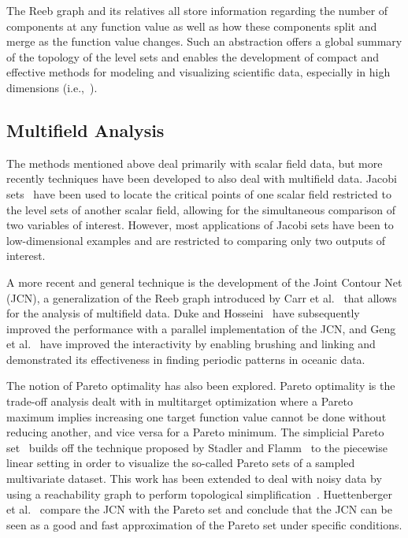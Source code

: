 
The Reeb graph and its relatives all store information regarding the number of components at any function value as well as how these components split and merge as the function value changes.
%
Such an abstraction offers a global summary of the topology of the level sets and enables the development of compact and effective methods for modeling and visualizing scientific data, especially in high dimensions (i.e.,~\cite{SinghMemoliCarlsson2007, NicolauLevineCarlsson2011}).

\subsection{Multifield Analysis}

The methods mentioned above deal primarily with scalar field data, but more recently techniques have been developed to also deal with multifield data.
%
Jacobi sets~\cite{EdelsbrunnerHarer2002} have been used to locate the critical points of one scalar field restricted to the level sets of another scalar field, allowing for the simultaneous comparison of two variables of interest.
%
However, most applications of Jacobi sets have been to low-dimensional examples and are restricted to comparing only two outputs of interest.

A more recent and general technique is the development of the Joint Contour Net (JCN), a generalization of the Reeb graph introduced by Carr et al.~\cite{CarrDuke2014,DukeCarrKnoll2012} that allows for the analysis of multifield data.
%
Duke and Hosseini~\cite{DukeHosseini2015} have subsequently improved the performance with a parallel implementation of the JCN, and Geng et al.~\cite{GengDukeCarr2015} have improved the interactivity by enabling brushing and linking and demonstrated its effectiveness in finding periodic patterns in oceanic data.

The notion of Pareto optimality has also been explored.
%
Pareto optimality is the trade-off analysis dealt with in multitarget optimization where a Pareto maximum implies increasing one target function value cannot be done without reducing another, and vice versa for a Pareto minimum.
%
The simplicial Pareto set~\cite{HuettenbergerHeineCarr2013} builds off the technique proposed by Stadler and Flamm~\cite{StadlerFlamm2003} to the piecewise linear setting in order to visualize the so-called Pareto sets of a sampled multivariate dataset.
%
This work has been extended to deal with noisy data by using a reachability graph to perform topological simplification~\cite{HuettenbergerHeineGarth2014}.
%
Huettenberger et al.~\cite{HuettenbergerHeineGarth2015} compare the JCN with the Pareto set and conclude that the JCN can be seen as a good and fast approximation of the Pareto set under specific conditions.

